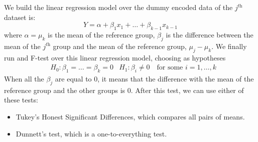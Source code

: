 We build the linear regression model over the dummy encoded data of the $j^{\textit{th}}$ dataset is:
\begin{equation*}
    Y = \alpha + \beta_1 x_1 + \ldots + \beta_{k-1} x_{k-1}
\end{equation*}
where $\alpha = \mu_k$ is the mean of the reference group, $\beta_j$ is the difference between the mean of the $j^{\textit{th}}$ group and the mean of the reference group, $\mu_j - \mu_k$. We finally run and F-test over this linear regression model, choosing as hypotheses
\begin{align*}
    &H_0 : \beta_1 = \ldots = \beta_k = 0 &H_1 : \beta_i \not = 0 \quad \text{for some } i = 1, \ldots, k
\end{align*}
When all the $\beta_j$ are equal to 0, it means that the difference with the mean of the reference group and the other groups is 0. After this test, we can use either of these tests:
\begin{itemize}
    \item Tukey's Honest Significant Differences, which compares all pairs of means.
    \item Dunnett's test, which is a one-to-everything test.
\end{itemize}

